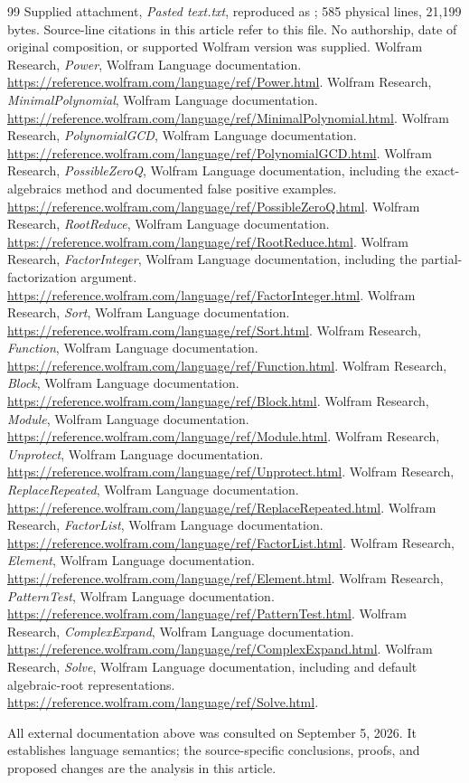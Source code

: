 \documentclass[11pt,letterpaper]{article}
\newcommand{\code}[1]{\texttt{\detokenize{#1}}}
\theoremstyle{definition}
\theoremstyle{remark}
\begin{document}
\clearpage
\begin{thebibliography}{99}
 Supplied attachment, \emph{Pasted text.txt}, reproduced as
\code{original.wl}; 585 physical lines, 21,199 bytes. Source-line citations in
this article refer to this file. No authorship, date of original composition,
or supported Wolfram version was supplied.
 Wolfram Research, \emph{Power}, Wolfram Language documentation.
\url{https://reference.wolfram.com/language/ref/Power.html}.
 Wolfram Research, \emph{MinimalPolynomial}, Wolfram
Language documentation.
\url{https://reference.wolfram.com/language/ref/MinimalPolynomial.html}.
 Wolfram Research, \emph{PolynomialGCD}, Wolfram Language
documentation.
\url{https://reference.wolfram.com/language/ref/PolynomialGCD.html}.
 Wolfram Research, \emph{PossibleZeroQ}, Wolfram Language
documentation, including the exact-algebraics method and documented false
positive examples.
\url{https://reference.wolfram.com/language/ref/PossibleZeroQ.html}.
 Wolfram Research, \emph{RootReduce}, Wolfram Language
documentation.
\url{https://reference.wolfram.com/language/ref/RootReduce.html}.
 Wolfram Research, \emph{FactorInteger}, Wolfram Language
documentation, including the partial-factorization \code{Automatic} argument.
\url{https://reference.wolfram.com/language/ref/FactorInteger.html}.
 Wolfram Research, \emph{Sort}, Wolfram Language documentation.
\url{https://reference.wolfram.com/language/ref/Sort.html}.
 Wolfram Research, \emph{Function}, Wolfram Language
documentation.
\url{https://reference.wolfram.com/language/ref/Function.html}.
 Wolfram Research, \emph{Block}, Wolfram Language documentation.
\url{https://reference.wolfram.com/language/ref/Block.html}.
 Wolfram Research, \emph{Module}, Wolfram Language documentation.
\url{https://reference.wolfram.com/language/ref/Module.html}.
 Wolfram Research, \emph{Unprotect}, Wolfram Language
documentation.
\url{https://reference.wolfram.com/language/ref/Unprotect.html}.
 Wolfram Research, \emph{ReplaceRepeated}, Wolfram
Language documentation.
\url{https://reference.wolfram.com/language/ref/ReplaceRepeated.html}.
 Wolfram Research, \emph{FactorList}, Wolfram Language
documentation.
\url{https://reference.wolfram.com/language/ref/FactorList.html}.
 Wolfram Research, \emph{Element}, Wolfram Language
documentation.
\url{https://reference.wolfram.com/language/ref/Element.html}.
 Wolfram Research, \emph{PatternTest}, Wolfram Language
documentation.
\url{https://reference.wolfram.com/language/ref/PatternTest.html}.
 Wolfram Research, \emph{ComplexExpand}, Wolfram Language
documentation.
\url{https://reference.wolfram.com/language/ref/ComplexExpand.html}.
 Wolfram Research, \emph{Solve}, Wolfram Language documentation,
including \code{Cubics} and default algebraic-root representations.
\url{https://reference.wolfram.com/language/ref/Solve.html}.
\end{thebibliography}
\noindent\small All external documentation above was consulted on September 5,
2026. It establishes language semantics; the source-specific conclusions,
proofs, and proposed changes are the analysis in this article.
\end{document}
